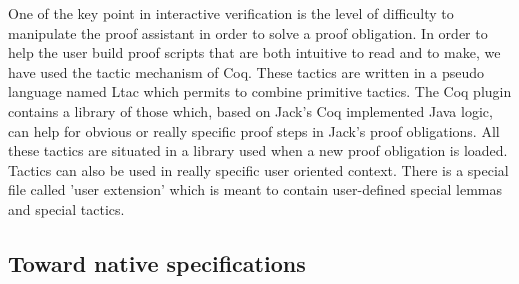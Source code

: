 One of the key point in interactive verification is the level of difficulty
to manipulate the proof assistant in order to solve a proof obligation.
In order to help the user build proof scripts that are both intuitive
to read and to make, we have used the tactic mechanism of Coq.
These tactics are written in a pseudo language named Ltac \cite{DEL-00-LTAC}
which permits to combine primitive tactics.
The Coq plugin contains a library of those which, based on Jack's Coq 
implemented Java logic, can help for obvious or really specific proof steps
in Jack's proof obligations. All these tactics are situated in a library 
used when a new proof obligation is loaded. Tactics can also be used in 
really specific user oriented context. There is a special file called 
'user extension' which is meant to contain user-defined
special lemmas and special tactics.



\subsection{Toward native specifications}



